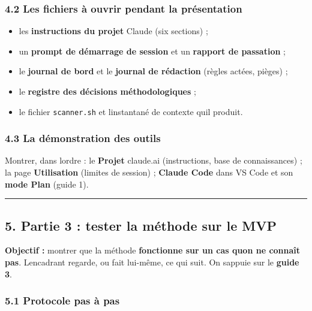\documentclass[
  french,
  11pt,
  a4paper,
]{article}
\providecommand{\tightlist}{%
  \setlength{\itemsep}{0pt}\setlength{\parskip}{0pt}}
\begin{document}
\subsubsection{4.2 Les fichiers à ouvrir pendant la
présentation}\label{42-les-fichiers-uxe0-ouvrir-pendant-la-pruxe9sentation}

\begin{itemize}
\tightlist
\item
  les \textbf{instructions du projet} Claude (six sections) ;
\item
  un \textbf{prompt de démarrage de session} et un \textbf{rapport de
  passation} ;
\item
  le \textbf{journal de bord} et le \textbf{journal de rédaction}
  (règles actées, pièges) ;
\item
  le \textbf{registre des décisions méthodologiques} ;
\item
  le fichier \texttt{scanner.sh} et l\textquotesingle instantané de
  contexte qu\textquotesingle il produit.
\end{itemize}

\subsubsection{4.3 La démonstration des
outils}\label{43-la-duxe9monstration-des-outils}

Montrer, dans l\textquotesingle ordre : le \textbf{Projet} claude.ai
(instructions, base de connaissances) ; la page \textbf{Utilisation}
(limites de session) ; \textbf{Claude Code} dans VS Code et son
\textbf{mode Plan} (guide 1).

\begin{center}\rule{0.5\linewidth}{0.5pt}\end{center}

\subsection{5. Partie 3 : tester la méthode sur le
MVP}\label{5-partie-3--tester-la-muxe9thode-sur-le-mvp}

\textbf{Objectif :} montrer que la méthode \textbf{fonctionne sur un cas
qu\textquotesingle on ne connaît pas}. L\textquotesingle encadrant
regarde, ou fait lui-même, ce qui suit. On s\textquotesingle appuie sur
le \textbf{guide 3}.

\subsubsection{5.1 Protocole pas à pas}\label{51-protocole-pas-uxe0-pas}
\end{document}
